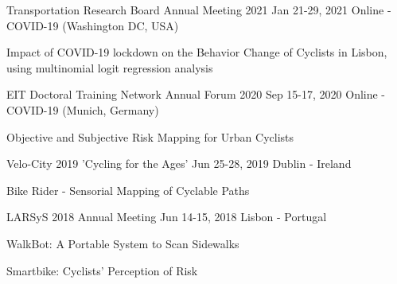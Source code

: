 \begin{cventries}

  \cventrypresentation
    {Transportation Research Board Annual Meeting 2021} %
    {Jan 21-29, 2021} %
    {Online - COVID-19 (Washington DC, USA)} %
    {
      \begin{cvpresentationitems} %
        \item {} {Impact of COVID-19 lockdown on the Behavior Change of Cyclists in Lisbon, using multinomial logit regression analysis}
      \end{cvpresentationitems}
    }


  \cventrypresentation
    {EIT Doctoral Training Network Annual Forum 2020} %
    {Sep 15-17, 2020} %
    {Online - COVID-19 (Munich, Germany)} %
    {
      \begin{cvpresentationitems} %
        \item {} {Objective and Subjective Risk Mapping for Urban Cyclists}
      \end{cvpresentationitems}
    }


  \cventrypresentation
    {Velo-City 2019 'Cycling for the Ages'} %
    {Jun 25-28, 2019} %
    {Dublin - Ireland} %
    {
      \begin{cvpresentationitems} %
        \item {} {Bike Rider - Sensorial Mapping of Cyclable Paths}
      \end{cvpresentationitems}
    }


  \cventrypresentation
    {LARSyS 2018 Annual Meeting} %
    {Jun 14-15, 2018} %
    {Lisbon - Portugal} %
    {
      \begin{cvpresentationitems} %
        \item {} {WalkBot: A Portable System to Scan Sidewalks}
        \item {} {Smartbike: Cyclists’ Perception of Risk}
      \end{cvpresentationitems}
    }


\end{cventries}
